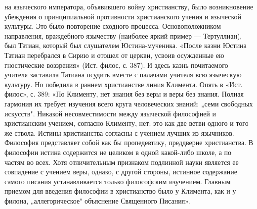 на  языческого   императора,  объявившего  войну   христианству,  было
возникновение  убеждения  о принципиальной  противности  христианского
учения и  языческой культуры.  Это было повторение  сходного процесса.
Основоположником  направления, враждебного  язычеству (наиболее  яркий
пример   ---  Тертуллиан),   был   Татиан,   который  был   слушателем
Юстина-мученика.  «После  казни Юстина  Татиан  перебрался  в Сирию  и
отошел  от  церкви,  усвоив   осужденные  ею  гностические  воззрения»
(Ист.  филос, с.  387). И  здесь казнь  почитаемого учителя  заставила
Татиана осудить вместе  с палачами учителя всю  языческую культуру. Но
победила в раннем  христианстве линия Климента. Опять  в «Ист. филос»,
с.  389:  «По  Клименту,  нет  знания без  веры  и  веры  без  знания.
Полная гармония  их требует изучения всего  круга человеческих знаний:
„семи  свободных искусств".  Никакой  несовместимости между  языческой
философией и христианским учением, согласно Клименту, нет: это как две
ветви  одного  и  того  же  ствола.  Истины  христианства  согласны  с
учением  лучших  из язычников.  Философия  представляет  собой как  бы
пропедевтику, преддверие  христианства. В философии  истина содержится
не  целиком в  одной  какой-либо  школе, а  по  частям  во всех.  Хотя
отличительным  признаком  подлинной  науки является  ее  совпадение  с
учением  веры, однако,  с другой  стороны, истинное  содержание самого
писания устанавливается только  философским изучением. Главным приемом
для введения философии в христианство было у Климента, как и у филона,
„аллегорическое" объяснение Священного Писания».

